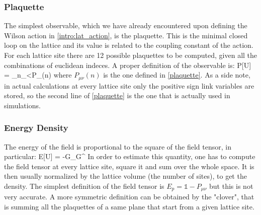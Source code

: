 \subsubsection{Plaquette}
The simplest observable, which we have already encountered upon defining the Wilson action in \ref{intro:lat_action}, is the plaquette. This is the minimal closed loop on the lattice and its value is related to the coupling constant of the action. For each lattice site there are 12 possible plaquettes to be computed, given all the combinations of euclidean indeces. A proper definition of the observable is:
\beq
    P[U] = \sum_{n\in\Lambda}\sum_{\mu<\nu}P_{\mu\nu}(n)
\eeq
where $P_{\mu\nu}(n)$ is the one defined in \ref{plaquette}. As a side note, in actual calculations at every lattice site only the positive sign link variables are stored, so the second line of \ref{plaquette} is the one that is actually used in simulations.

\subsubsection{Energy Density}
The energy of the field is proportional to the square of the field tensor, in particular:
\beq
    E[U] = -G_{\mu\nu}G^{\mu\nu}
\eeq
In order to estimate this quantity, one has to compute the field tensor at every lattice site, square it and sum over the whole space. It is then usually normalized by the lattice volume (the number of sites), to get the density. The simplest definition of the field tensor is $E_p = \mathds{1} - P_{\mu\nu}$ but this is not very accurate. A more symmetric definition can be obtained by the "clover", that is summing all the plaquettes of a same plane that start from a given lattice site. 

